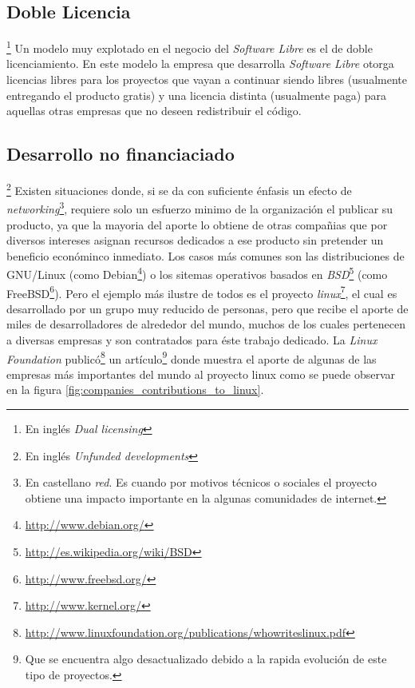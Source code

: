 \subsection{Doble Licencia}\footnote{En ingl\'es \emph{Dual licensing}}
%
Un modelo muy explotado en el negocio del \emph{Software Libre} es el de doble
licenciamiento. En este modelo la empresa que desarrolla \emph{Software
Libre} otorga licencias libres para los proyectos que vayan a continuar siendo
libres (usualmente entregando el producto gratis) y una licencia distinta
(usualmente paga) para aquellas otras empresas que no deseen redistribuir el
c\'odigo. 

\subsection{Desarrollo no financiaciado}\footnote{En ingl\'es \emph{Unfunded
developments}}
%
Existen situaciones donde, si se da con suficiente \'enfasis un efecto de
\emph{networking}\footnote{En castellano \emph{red}. Es cuando por motivos
t\'ecnicos o sociales el proyecto obtiene una impacto importante en la
algunas comunidades de internet.}, requiere solo un esfuerzo minimo de la
organizaci\'on el publicar su producto, ya que la mayoria del aporte lo
obtiene de otras compa\~nias que por diversos intereses asignan recursos
dedicados a ese producto sin pretender un beneficio econ\'ominco inmediato.
Los casos m\'as comunes son las distribuciones de GNU/Linux (como
Debian\footnote{\url{http://www.debian.org/}}) o los sitemas operativos
basados en \emph{BSD}\footnote{\url{http://es.wikipedia.org/wiki/BSD}} (como
FreeBSD\footnote{\url{http://www.freebsd.org/}}). Pero el ejemplo m\'as
ilustre de todos es el proyecto
\emph{linux}\footnote{\url{http://www.kernel.org/}}, el cual es desarrollado
por un grupo muy reducido de personas, pero que recibe el aporte de miles de
desarrolladores de alrededor del mundo, muchos de los cuales pertenecen a
diversas empresas y son contratados para \'este trabajo dedicado.
La \emph{Linux Foundation}
public\'o\footnote{\url{
http://www.linuxfoundation.org/publications/whowriteslinux.pdf}} un
art\'iculo\footnote{Que se encuentra algo desactualizado debido a la rapida
evoluci\'on de este tipo de proyectos.} donde muestra el aporte de algunas de
las empresas m\'as importantes del mundo al proyecto linux como se puede
observar en la figura \ref{fig:companies_contributions_to_linux}.

